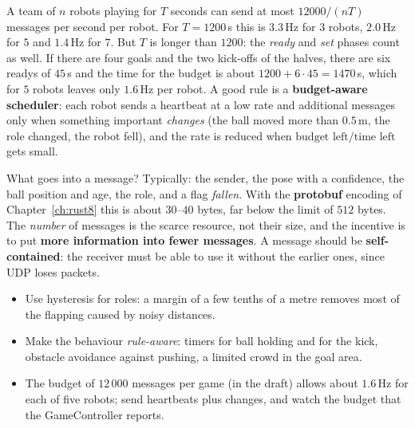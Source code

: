 A team of $n$ robots playing for $T$ seconds can send at most $12000/(nT)$ messages per second per robot. For $T=1200$\,s this is $3.3$\,Hz for $3$ robots, $2.0$\,Hz for $5$ and $1.4$\,Hz for $7$. But $T$ is longer than $1200$: the \emph{ready} and \emph{set} phases count as well. If there are four goals and the two kick-offs of the halves, there are six readys of $45$\,s and the time for the budget is about $1200+6\cdot45=1470$\,s, which for $5$ robots leaves only $1.6$\,Hz per robot. A good rule is a \textbf{budget-aware scheduler}: each robot sends a heartbeat at a low rate and additional messages only when something important \emph{changes} (the ball moved more than $0.5$\,m, the role changed, the robot fell), and the rate is reduced when $\text{budget left}/\text{time left}$ gets small.

\begin{aibox}
What goes into a message? Typically: the sender, the pose with a confidence, the ball position and age, the role, and a flag \emph{fallen}. With the \textbf{protobuf} encoding of Chapter~\ref{ch:rust8} this is about $30$--$40$ bytes, far below the limit of $512$ bytes. The \emph{number} of messages is the scarce resource, not their size, and the incentive is to put \textbf{more information into fewer messages}. A message should be \textbf{self-contained}: the receiver must be able to use it without the earlier ones, since UDP loses packets.
\end{aibox}

\begin{keyidea}[Summary]
\begin{itemize}[nosep]
 \item Use hysteresis for roles: a margin of a few tenths of a metre removes most of the flapping caused by noisy distances.
 \item Make the behaviour \emph{rule-aware}: timers for ball holding and for the kick, obstacle avoidance against pushing, a limited crowd in the goal area.
 \item The budget of $12\,000$ messages per game (in the draft) allows about $1.6$\,Hz for each of five robots; send heartbeats plus changes, and watch the budget that the GameController reports.
\end{itemize}
\end{keyidea}

